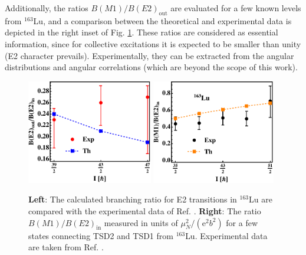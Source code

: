 Additionally, the ratios $B(M1)/B(E2)_\text{out}$ are evaluated for a few known levels from $^{163}$Lu, and a comparison between the theoretical and experimental data is depicted in the right inset of Fig. \ref{figs-ratio-BM1-BE2-IN-OUT}. These ratios are considered as essential information, since for collective excitations it is expected to be smaller than unity (E2 character prevails). Experimentally, they can be extracted from the angular distributions and angular correlations \cite{lvThesis} (which are beyond the scope of this work).
\begin{figure}
    \centering
    \includegraphics[width=0.49\textwidth]{Chapters/Figures/BE2inout-3.pdf}
    \includegraphics[width=0.48\textwidth]{Chapters/Figures/BE2inout-4.pdf}
    \caption{\textbf{Left}: The calculated branching ratio for E2 transitions in $^{163}$Lu are compared with the experimental data of Ref. \cite{amro2003wobbling}. \textbf{Right}: The ratio $B(M1)/B(E2)_\text{in}$ measured in units of $\mu_N^2/(\mathrm{e}^2b^2)$ for a few states connecting TSD2 and TSD1 from $^{163}$Lu. Experimental data are taken from Ref. \cite{reich2010nuclear}.}
    \label{figs-ratio-BM1-BE2-IN-OUT}
\end{figure}

